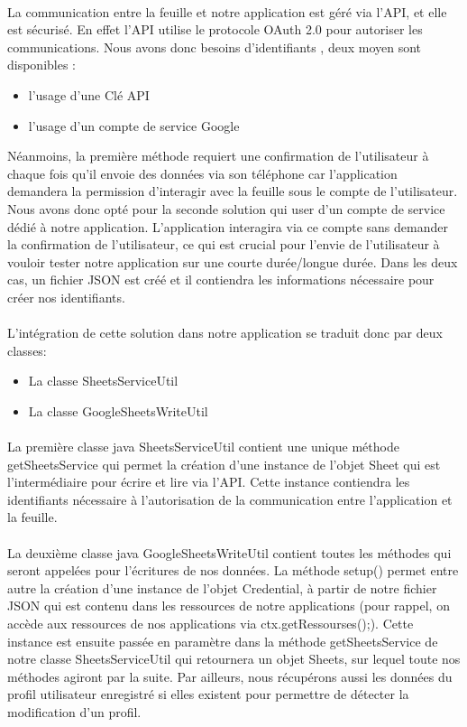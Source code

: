 \documentclass[../main.tex]{subfiles}
\begin{document}
\paragraph{}
La communication entre la feuille et notre application est géré via l’API, et elle est sécurisé. En effet l’API utilise le protocole OAuth 2.0 pour autoriser les communications. Nous avons donc besoins d’identifiants , deux moyen sont disponibles :
 \begin{itemize}
\item l’usage d’une Clé API
\item l’usage d’un compte de service Google
\end{itemize}
Néanmoins, la première méthode requiert une confirmation de l’utilisateur à chaque fois qu’il envoie des données via son téléphone car l’application demandera la permission d'interagir avec la feuille sous le compte de l’utilisateur. Nous avons donc opté pour la seconde solution qui user d’un compte de service dédié à notre application. L’application interagira via ce compte sans demander la confirmation de l’utilisateur, ce qui est crucial pour l’envie de l’utilisateur à vouloir tester notre application sur une courte durée/longue durée.
Dans les deux cas, un fichier JSON est créé et il contiendra les informations nécessaire pour créer nos identifiants.

\paragraph{}
L’intégration de cette solution dans notre application se traduit donc par deux classes:
 \begin{itemize}
\item La classe SheetsServiceUtil
\item La classe GoogleSheetsWriteUtil
\end{itemize}
\paragraph{}
La première classe java SheetsServiceUtil contient une unique méthode getSheetsService qui permet la création d’une instance de l’objet Sheet qui est l'intermédiaire pour écrire et lire via l’API. Cette instance contiendra les identifiants nécessaire à l’autorisation de la communication entre l’application et la feuille.
\paragraph{}
La deuxième classe java GoogleSheetsWriteUtil contient toutes les méthodes qui seront appelées pour l’écritures de nos données. 
La méthode setup() permet entre autre la création d’une instance de l’objet Credential, à partir de notre fichier JSON qui est contenu dans les ressources de notre applications (pour rappel, on accède aux ressources de nos applications via ctx.getRessourses();). Cette instance est ensuite passée en paramètre dans la méthode getSheetsService de notre classe SheetsServiceUtil qui retournera un objet Sheets, sur lequel toute nos méthodes agiront par la suite.
Par ailleurs, nous récupérons aussi les données du profil utilisateur enregistré si elles existent pour permettre de détecter la modification d’un profil.
\end{document}
